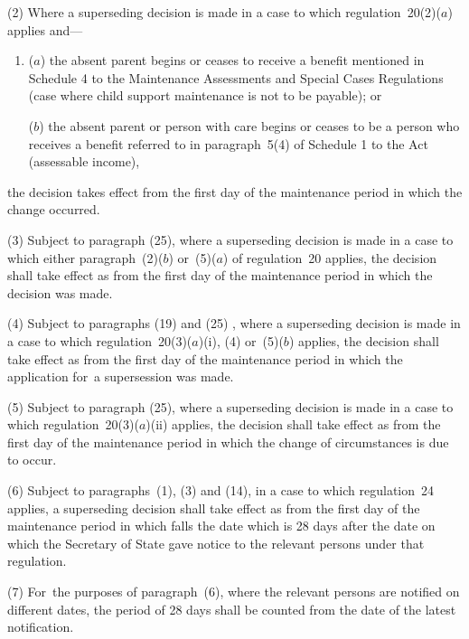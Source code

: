 \documentclass[a4paper,12pt]{article}
\begin{document}
(2) Where a superseding decision is made in a case to which regulation~20(2)($a$)  applies and—
\begin{enumerate}\item[]
($a$) the absent parent begins or ceases to receive a benefit mentioned in Schedule 4 to the Maintenance Assessments and Special Cases Regulations (case where child support maintenance is not to be payable); or

($b$) the absent parent or person with care begins or ceases to be a person who receives a benefit referred to in paragraph~5(4) of Schedule 1 to the Act (assessable income),
\end{enumerate}
the decision takes effect from the first day of the maintenance period in which the change occurred.

(3) 
Subject to paragraph (25),  %
where a superseding decision is made in a case to which either paragraph~(2)($b$) or~(5)($a$) of regulation~20 applies, the decision shall take effect as from the first day of the maintenance period in which the decision was made.

(4) 
Subject to 
paragraphs (19) and (25)%
, where a superseding decision is made  %
in a case to which regulation~20(3)($a$)(i), (4) or~(5)($b$) applies, the decision shall take effect as from the first day of the maintenance period in which the application for~a supersession was made.

(5) 
Subject to paragraph (25),  %
where a superseding decision is made in a case to which regulation~20(3)($a$)(ii) applies, the decision shall take effect as from the first day of the maintenance period in which the change of circumstances is due to occur.

(6) Subject to paragraphs~(1), (3) and (14), in a case to which regulation~24 applies, a superseding decision shall take effect as from the first day of the maintenance period in which falls the date which is 28 days after the date on which the Secretary of State gave notice to the relevant persons under that regulation.

(7) For~the purposes of paragraph~(6), where the relevant persons are notified on different dates, the period of 28 days shall be counted from the date of the latest notification.
\end{document}
